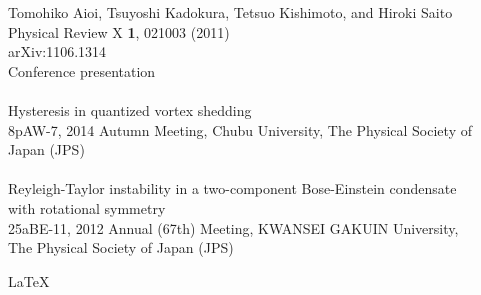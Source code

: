 \documentclass[12pt,a4paper]{report}
\begin{document}
Tomohiko Aioi, Tsuyoshi Kadokura, Tetsuo Kishimoto, and Hiroki Saito 
\\
Physical Review X {\bf 1}, 021003 (2011) 
\\
arXiv:1106.1314
\newpage
\ 
\\
Conference presentation
\\
\\
Hysteresis in quantized vortex shedding
\\
8pAW-7, 2014 Autumn Meeting, Chubu University, The Physical Society of Japan (JPS)
\\
\\
Reyleigh-Taylor instability in a two-component Bose-Einstein condensate
\\
with rotational symmetry
\\
25aBE-11, 2012 Annual (67th) Meeting, KWANSEI GAKUIN University,
\\
The Physical Society of Japan (JPS)

\begin{flushright}
\LaTeX \\
\end{flushright}
\end{document}
